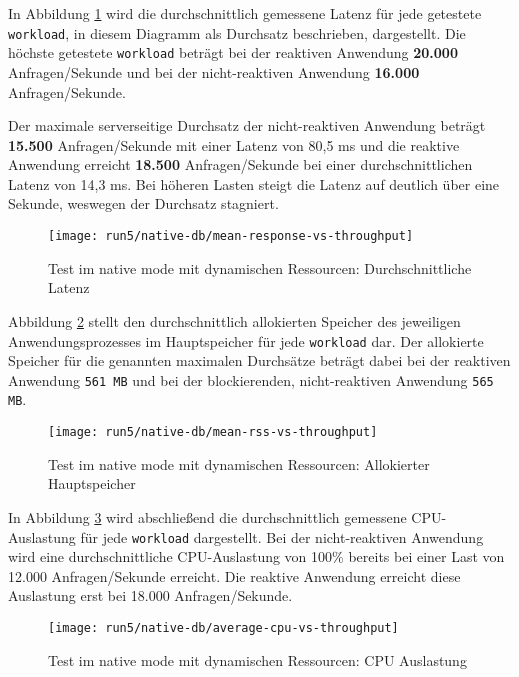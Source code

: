 In Abbildung \ref{fig:native_dynamic_mean_response} wird die durchschnittlich gemessene Latenz für jede getestete \verb|workload|,
in diesem Diagramm als Durchsatz beschrieben, dargestellt.
Die höchste getestete \verb|workload| beträgt bei der reaktiven Anwendung \textbf{20.000} Anfragen/Sekunde und bei der
nicht-reaktiven Anwendung \textbf{16.000} Anfragen/Sekunde.

Der maximale serverseitige Durchsatz der nicht-reaktiven Anwendung beträgt \textbf{15.500} Anfragen/Sekunde mit einer
Latenz von 80,5 ms und
die reaktive Anwendung erreicht \textbf{18.500} Anfragen/Sekunde bei einer durchschnittlichen Latenz von 14,3 ms.
Bei höheren Lasten steigt die Latenz auf deutlich über eine Sekunde, weswegen der Durchsatz stagniert.

\begin{figure}[ht!]
  \centering
  \texttt{[image: run5/native-db/mean-response-vs-throughput]}
  \caption{Test im native mode mit dynamischen Ressourcen: Durchschnittliche Latenz}
  \label{fig:native_dynamic_mean_response}
\end{figure}
\newpage
Abbildung \ref{fig:native_dynamic_mean_rss} stellt den durchschnittlich allokierten Speicher des jeweiligen Anwendungsprozesses
im Hauptspeicher für jede \verb|workload| dar. Der allokierte Speicher für die genannten maximalen Durchsätze beträgt dabei bei
der reaktiven Anwendung \verb|561 MB| und bei der blockierenden, nicht-reaktiven Anwendung \verb|565 MB|.

\begin{figure}[ht!]
  \centering
  \texttt{[image: run5/native-db/mean-rss-vs-throughput]}
  \caption{Test im native mode mit dynamischen Ressourcen: Allokierter Hauptspeicher}
  \label{fig:native_dynamic_mean_rss}
\end{figure}

In Abbildung \ref{fig:native_dynamic_avg_cpu} wird abschließend die durchschnittlich gemessene CPU-Auslastung für jede \verb|workload|
dargestellt. Bei der nicht-reaktiven Anwendung wird eine durchschnittliche CPU-Auslastung von 100\% bereits bei einer Last von
12.000 Anfragen/Sekunde erreicht. Die reaktive Anwendung erreicht diese Auslastung erst bei 18.000 Anfragen/Sekunde.
\newpage
\begin{figure}[ht!]
  \centering
  \texttt{[image: run5/native-db/average-cpu-vs-throughput]}
  \caption{Test im native mode mit dynamischen Ressourcen: CPU Auslastung}
  \label{fig:native_dynamic_avg_cpu}
\end{figure}

